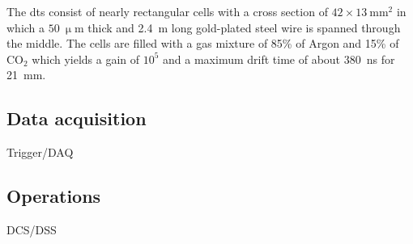 The \glspl{dt} consist of nearly rectangular cells with a cross section of $42\times 13~\mathrm{mm}^{2}$ in which a $50~\upmu\mathrm{m}$ thick and 2.4~m long gold-plated steel wire is spanned through the middle. The cells are filled with a gas mixture of 85\% of Argon and 15\% of $\mathrm{CO}_{2}$ which yields a gain of $10^{5}$ and a maximum drift time of about 380~ns for 21~mm.


\subsection{Data acquisition}
Trigger/DAQ

\subsection{Operations}
DCS/DSS
